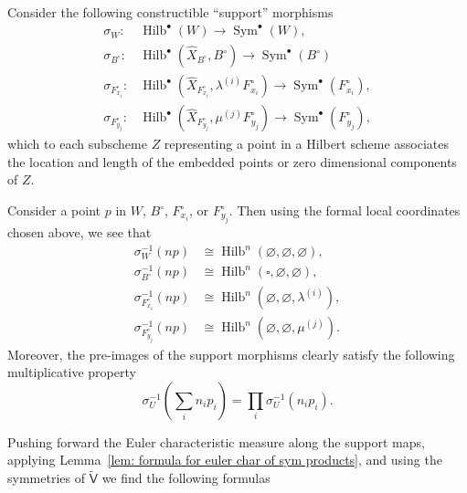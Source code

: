 \documentclass[12pt]{amsart}
\theoremstyle{definition}
\newcommand{\sfVtilde}{\widetilde{\mathsf{V}}}
\newcommand{\Sym}{\operatorname{Sym}}
\newcommand{\Hilb}{\operatorname{Hilb}}
\renewcommand{\emptyset}{\varnothing}
\newcommand{\Xhat}{\widehat{X}}
\newcommand{\bx}{\square}
\begin{document}
Consider the following constructible ``support'' morphisms
\begin{align*}
\sigma_{W}:& \Hilb^{\bullet}(W) \to \Sym^{\bullet}(W),\\
\sigma_{B^{\circ }}:& \Hilb^{\bullet}(\Xhat_{B^{\circ}},B^{\circ}) \to \Sym^{\bullet}(B^{\circ })\\
\sigma_{F_{x_{i}}^{\circ }}:& \Hilb^{\bullet}(\Xhat_{F_{x_{i}}^{\circ}},\lambda^{(i)}F_{x_{i}}^{\circ}) \to \Sym^{\bullet}(F_{x_{i}}^{\circ }),\\
\sigma_{F_{y_{j}}^{\circ }}:& \Hilb^{\bullet}(\Xhat_{F_{y_{j}}^{\circ}},\mu^{(j)}F_{y_{j}}^{\circ}) \to \Sym^{\bullet}(F_{y_{j}}^{\circ }),
\end{align*}
which to each subscheme $Z$ representing a point in a Hilbert scheme
associates the location and length of the embedded points or zero
dimensional components of $Z$. 

Consider a point $p$ in $W$, $B^{\circ}$, $F_{x_{i}}^{\circ }$, or
$F_{y_{j}}^{\circ}$. Then using the formal local coordinates chosen
above, we see that 
\begin{align*}
\sigma_{W}^{-1}(np) &\cong \Hilb^{n}\left(\emptyset ,\emptyset,\emptyset \right), \\
\sigma_{B^{\circ }}^{-1}(np) &\cong \Hilb^{n}\left(\bx ,\emptyset ,\emptyset \right), \\
\sigma_{F_{x_{i}}^{\circ }}^{-1}(np) &\cong \Hilb^{n}\left(\emptyset  ,\emptyset,\lambda^{(i)}  \right), \\
\sigma_{F_{y_{j}}^{\circ }}^{-1}(np) &\cong \Hilb^{n}\left(\emptyset
,\emptyset,\mu^{(j)} \right).
\end{align*}
Moreover, the pre-images of the support morphisms clearly satisfy the
following multiplicative property
\[
\sigma^{-1}_{U}\left(\sum_{i}n_{i}p_{i} \right) = \prod_{i}
\sigma^{-1}_{U}\left(n_{i}p_{i} \right).
\]


Pushing forward the Euler characteristic measure along the support
maps, applying Lemma~\ref{lem: formula for euler char of sym
products}, and using the symmetries of $\sfVtilde$ we find the
following formulas
\end{document}
